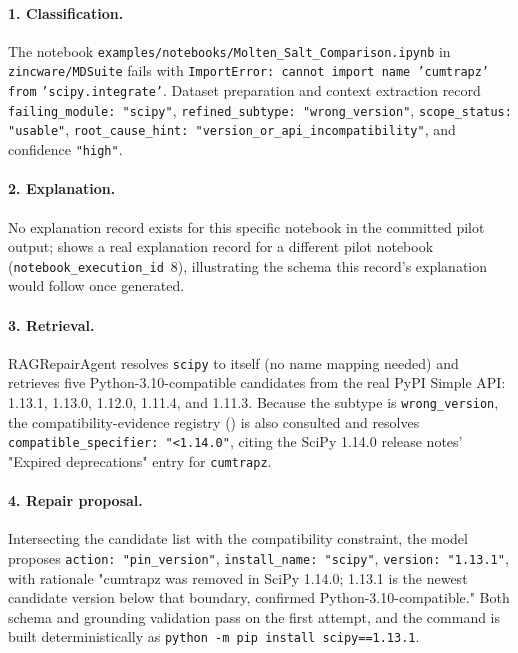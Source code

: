 \paragraph{1. Classification.} The notebook
\texttt{examples/notebooks/Molten\_Salt\_Comparison.ipynb} in
\texttt{zincware/MDSuite} fails with
\texttt{ImportError: cannot import name 'cumtrapz' from}
\texttt{'scipy.integrate'}. Dataset preparation and context extraction
record \texttt{failing\_module: "scipy"}, \texttt{refined\_subtype:
"wrong\_version"}, \texttt{scope\_status: "usable"},
\texttt{root\_cause\_hint: "version\_or\_api\_incompatibility"}, and
confidence \texttt{"high"}.

\paragraph{2. Explanation.} No explanation record exists for this specific
notebook in the committed pilot output; 
shows a real explanation record for a different pilot notebook
(\texttt{notebook\_execution\_id}~8), illustrating the schema this record's
explanation would follow once generated.

\paragraph{3. Retrieval.} RAGRepairAgent resolves \texttt{scipy} to itself
(no name mapping needed) and retrieves five Python-3.10-compatible
candidates from the real PyPI Simple API: 1.13.1, 1.13.0, 1.12.0, 1.11.4,
and 1.11.3. Because the subtype is \texttt{wrong\_version}, the
compatibility-evidence registry () is also consulted and
resolves \texttt{compatible\_\allowbreak specifier: "<1.14.0"}, citing the SciPy 1.14.0
release notes' "Expired deprecations" entry for \texttt{cumtrapz}.

\paragraph{4. Repair proposal.} Intersecting the candidate list with the
compatibility constraint, the model proposes \texttt{action: "pin\_version"},
\texttt{install\_name: "scipy"}, \texttt{version: "1.13.1"}, with rationale
"cumtrapz was removed in SciPy 1.14.0; 1.13.1 is the newest candidate
version below that boundary, confirmed Python-3.10-compatible." Both schema
and grounding validation pass on the first attempt, and the command is
built deterministically as \texttt{python -m pip install scipy==1.13.1}.

